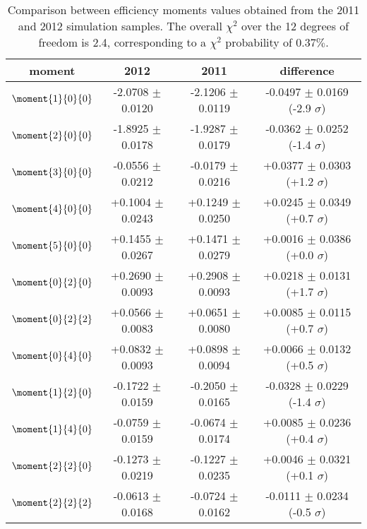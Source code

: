 \begin{table}
\centering
\footnotesize
\begin{tabular}{c c c c}
  \hline
        moment         &  2012    &    2011  &   difference                        \\
  \hline
  $\moment{1}{0}{0}$   & -2.0708 $\pm$  0.0120  &  -2.1206 $\pm$  0.0119  &  -0.0497 $\pm$  0.0169 (-2.9 $\sigma$) \\
  $\moment{2}{0}{0}$   & -1.8925 $\pm$  0.0178  &  -1.9287 $\pm$  0.0179  &  -0.0362 $\pm$  0.0252 (-1.4 $\sigma$) \\
  $\moment{3}{0}{0}$   & -0.0556 $\pm$  0.0212  &  -0.0179 $\pm$  0.0216  &  +0.0377 $\pm$  0.0303 (+1.2 $\sigma$) \\
  $\moment{4}{0}{0}$   & +0.1004 $\pm$  0.0243  &  +0.1249 $\pm$  0.0250  &  +0.0245 $\pm$  0.0349 (+0.7 $\sigma$) \\
  $\moment{5}{0}{0}$   & +0.1455 $\pm$  0.0267  &  +0.1471 $\pm$  0.0279  &  +0.0016 $\pm$  0.0386 (+0.0 $\sigma$) \\
  $\moment{0}{2}{0}$   & +0.2690 $\pm$  0.0093  &  +0.2908 $\pm$  0.0093  &  +0.0218 $\pm$  0.0131 (+1.7 $\sigma$) \\
  $\moment{0}{2}{2}$   & +0.0566 $\pm$  0.0083  &  +0.0651 $\pm$  0.0080  &  +0.0085 $\pm$  0.0115 (+0.7 $\sigma$) \\
  $\moment{0}{4}{0}$   & +0.0832 $\pm$  0.0093  &  +0.0898 $\pm$  0.0094  &  +0.0066 $\pm$  0.0132 (+0.5 $\sigma$) \\
  $\moment{1}{2}{0}$   & -0.1722 $\pm$  0.0159  &  -0.2050 $\pm$  0.0165  &  -0.0328 $\pm$  0.0229 (-1.4 $\sigma$) \\
  $\moment{1}{4}{0}$   & -0.0759 $\pm$  0.0159  &  -0.0674 $\pm$  0.0174  &  +0.0085 $\pm$  0.0236 (+0.4 $\sigma$) \\
  $\moment{2}{2}{0}$   & -0.1273 $\pm$  0.0219  &  -0.1227 $\pm$  0.0235  &  +0.0046 $\pm$  0.0321 (+0.1 $\sigma$) \\
  $\moment{2}{2}{2}$   & -0.0613 $\pm$  0.0168  &  -0.0724 $\pm$  0.0162  &  -0.0111 $\pm$  0.0234 (-0.5 $\sigma$) \\
  \hline
\end{tabular}
\caption{Comparison between efficiency moments values obtained from the 2011 and 2012 \BsJpsiKst simulation samples.
         The overall $\chi^2$ over the 12 degrees of freedom is 2.4, corresponding to a $\chi^2$ probability of $0.37\%$.}
\label{moms_comp_periods_neg}
\end{table}

